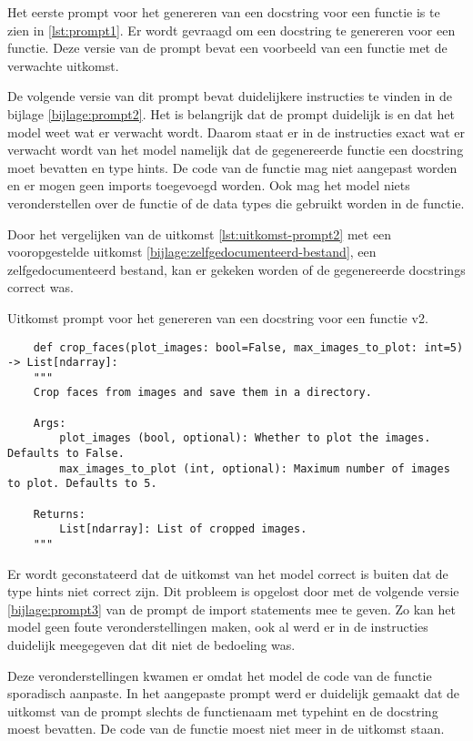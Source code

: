 Het eerste prompt voor het genereren van een docstring voor een functie is te zien in \ref{lst:prompt1}.
Er wordt gevraagd om een docstring te genereren voor een functie. Deze versie van de prompt bevat een voorbeeld van een functie met de verwachte uitkomst. 

De volgende versie van dit prompt bevat duidelijkere instructies te vinden in de bijlage \ref{bijlage:prompt2}.
Het is belangrijk dat de prompt duidelijk is en dat het model weet wat er verwacht wordt. 
Daarom staat er in de instructies exact wat er verwacht wordt van het model namelijk dat de gegenereerde functie een docstring moet bevatten en type hints.
De code van de functie mag niet aangepast worden en er mogen geen imports toegevoegd worden.
Ook mag het model niets veronderstellen over de functie of de data types die gebruikt worden in de functie.

Door het vergelijken van de uitkomst \ref{lst:uitkomst-prompt2} met een vooropgestelde uitkomst \ref{bijlage:zelfgedocumenteerd-bestand}, een zelfgedocumenteerd bestand, kan er gekeken worden of de gegenereerde docstrings correct was.
\begin{listing}
    \caption{Uitkomst prompt voor het genereren van een docstring voor een functie v2.}
    \label{lst:uitkomst-prompt2}
    \begin{verbatim}
    def crop_faces(plot_images: bool=False, max_images_to_plot: int=5) -> List[ndarray]:
    """
    Crop faces from images and save them in a directory.

    Args:
        plot_images (bool, optional): Whether to plot the images. Defaults to False.
        max_images_to_plot (int, optional): Maximum number of images to plot. Defaults to 5.

    Returns:
        List[ndarray]: List of cropped images.
    """
    \end{verbatim}
\end{listing}
Er wordt geconstateerd dat de uitkomst van het model correct is buiten dat de type hints niet correct zijn. 
Dit probleem is opgelost door met de volgende versie \ref{bijlage:prompt3} van de prompt de import statements mee te geven.
Zo kan het model geen foute veronderstellingen maken, ook al werd er in de instructies duidelijk meegegeven dat dit niet de bedoeling was.

Deze veronderstellingen kwamen er omdat het model de code van de functie sporadisch aanpaste.
In het aangepaste prompt werd er duidelijk gemaakt dat de uitkomst van de prompt slechts de functienaam met typehint en de docstring moest bevatten.
De code van de functie moest niet meer in de uitkomst staan.

